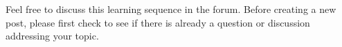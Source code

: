 

Feel free to discuss this learning sequence in the forum.  Before creating a new post, please first check to see if there is already a question or discussion addressing your topic.  
\endedxtext

